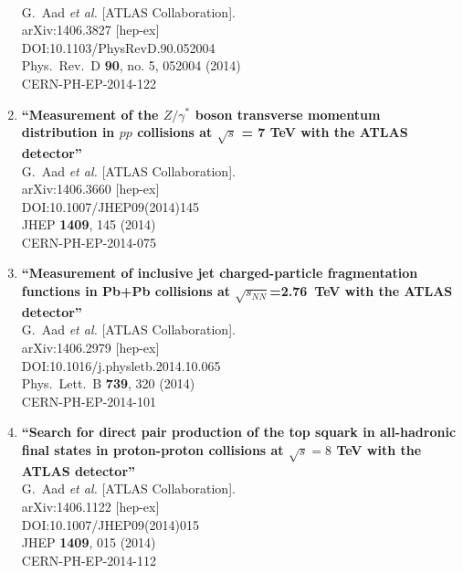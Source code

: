 \documentclass{article}
\begin{document}
\begin{enumerate}
  \\{}G.~Aad {\it et al.} [ATLAS Collaboration].
  \\{}arXiv:1406.3827 [hep-ex]
  \\{}DOI:10.1103/PhysRevD.90.052004
  \\{}Phys.\ Rev.\ D {\bf 90}, no. 5, 052004 (2014)
  \\{}CERN-PH-EP-2014-122
\item%
{\bf ``Measurement of the $Z/\gamma^*$ boson transverse momentum distribution in $pp$ collisions at $\sqrt{s}$ = 7 TeV with the ATLAS detector''}
  \\{}G.~Aad {\it et al.} [ATLAS Collaboration].
  \\{}arXiv:1406.3660 [hep-ex]
  \\{}DOI:10.1007/JHEP09(2014)145
  \\{}JHEP {\bf 1409}, 145 (2014)
  \\{}CERN-PH-EP-2014-075
\item%
{\bf ``Measurement of inclusive jet charged-particle fragmentation functions in Pb+Pb collisions at $\sqrt{s_{NN}}$=2.76 TeV with the ATLAS detector''}
  \\{}G.~Aad {\it et al.} [ATLAS Collaboration].
  \\{}arXiv:1406.2979 [hep-ex]
  \\{}DOI:10.1016/j.physletb.2014.10.065
  \\{}Phys.\ Lett.\ B {\bf 739}, 320 (2014)
  \\{}CERN-PH-EP-2014-101
\item%
{\bf ``Search for direct pair production of the top squark in all-hadronic final states in proton-proton collisions at $\sqrt{s}=8$ TeV with the ATLAS detector''}
  \\{}G.~Aad {\it et al.} [ATLAS Collaboration].
  \\{}arXiv:1406.1122 [hep-ex]
  \\{}DOI:10.1007/JHEP09(2014)015
  \\{}JHEP {\bf 1409}, 015 (2014)
  \\{}CERN-PH-EP-2014-112

\end{enumerate}
\end{document}
